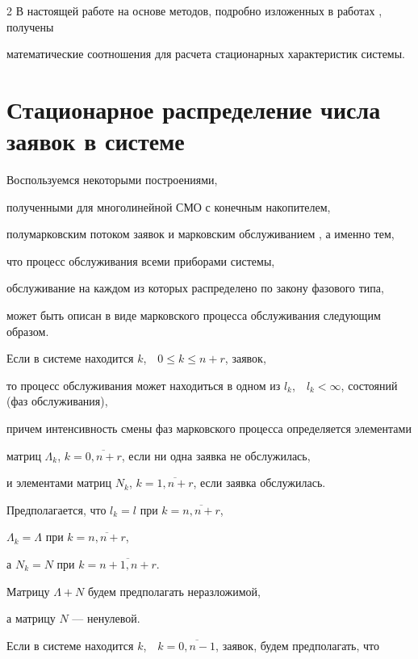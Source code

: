 \begin{multicols}{2}
В настоящей работе на основе методов, подробно изложенных в работах \cite{PCh03,PCh04}, получены


математические соотношения для расчета стационарных характеристик системы.





\section{Стационарное распределение числа заявок в системе}





Воспользуемся некоторыми построениями,


полученными для многолинейной СМО с конечным накопителем,


полумарковским потоком заявок и марковским обслуживанием \cite{PCh04}, а именно тем,


что процесс обслуживания всеми приборами системы,


обслуживание на каждом из которых распределено по закону фазового типа,


может быть описан в виде марковского процесса обслуживания следующим образом.





Если в системе находится $k$,\ \ $0\le k\le n+r$, заявок,


то процесс обслуживания может находиться в одном из $l_k$,\ \ $l_k<\infty$, состояний (фаз обслуживания),


причем интенсивность смены фаз марковского процесса определяется элементами


матриц $\Lambda_k$, $k=\overline{0,n+r}$, если ни одна заявка не обслужилась,


и элементами матриц $N_k$, $k=\overline{1,n+r}$, если заявка обслужилась.


Предполагается, что $l_k=l$ при $k=\overline{n,n+r}$,


$\Lambda_k = \Lambda$ при $k=\overline{n,n+r}$,


а $N_k = N$ при $k=\overline{n+1,n+r}$.


Матрицу $\Lambda+N$ будем предполагать неразложимой,


а матрицу $N$ --- ненулевой.





Если в системе находится $k$,\ \ $k=\overline{0,n-1}$, заявок, будем предполагать, что



\end{multicols}
